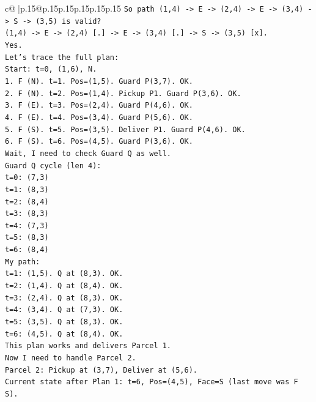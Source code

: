 \documentclass{article}
\begin{document}
{\begin{supertabular}{c@{$\;$}|p{.15\linewidth}@{}p{.15\linewidth}p{.15\linewidth}p{.15\linewidth}p{.15\linewidth}p{.15\linewidth}}
{{{\texttt{So path (1,4) {-}> E {-}> (2,4) {-}> E {-}> (3,4) {-}> S {-}> (3,5) is valid?} \\
\texttt{(1,4) {-}> E {-}> (2,4) {[}.{]} {-}> E {-}> (3,4) {[}.{]} {-}> S {-}> (3,5) {[}x{]}.} \\
\texttt{Yes.} \\
\texttt{Let's trace the full plan:} \\
\texttt{Start: t=0, (1,6), N.} \\
\texttt{1. F (N). t=1. Pos=(1,5). Guard P(3,7). OK.} \\
\texttt{2. F (N). t=2. Pos=(1,4). Pickup P1. Guard P(3,6). OK.} \\
\texttt{3. F (E). t=3. Pos=(2,4). Guard P(4,6). OK.} \\
\texttt{4. F (E). t=4. Pos=(3,4). Guard P(5,6). OK.} \\
\texttt{5. F (S). t=5. Pos=(3,5). Deliver P1. Guard P(4,6). OK.} \\
\texttt{6. F (S). t=6. Pos=(4,5). Guard P(3,6). OK.} \\
\texttt{Wait, I need to check Guard Q as well.} \\
\texttt{Guard Q cycle (len 4):} \\
\texttt{t=0: (7,3)} \\
\texttt{t=1: (8,3)} \\
\texttt{t=2: (8,4)} \\
\texttt{t=3: (8,3)} \\
\texttt{t=4: (7,3)} \\
\texttt{t=5: (8,3)} \\
\texttt{t=6: (8,4)} \\
\texttt{My path:} \\
\texttt{t=1: (1,5). Q at (8,3). OK.} \\
\texttt{t=2: (1,4). Q at (8,4). OK.} \\
\texttt{t=3: (2,4). Q at (8,3). OK.} \\
\texttt{t=4: (3,4). Q at (7,3). OK.} \\
\texttt{t=5: (3,5). Q at (8,3). OK.} \\
\texttt{t=6: (4,5). Q at (8,4). OK.} \\
\texttt{This plan works and delivers Parcel 1.} \\
\texttt{Now I need to handle Parcel 2.} \\
\texttt{Parcel 2: Pickup at (3,7), Deliver at (5,6).} \\
\texttt{Current state after Plan 1: t=6, Pos=(4,5), Face=S (last move was F S).} \\
}}}
\end{supertabular}}
\end{document}
